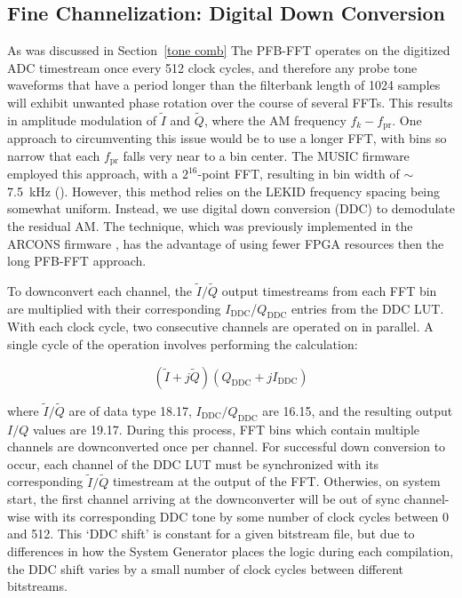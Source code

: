 \subsection{Fine Channelization: Digital Down Conversion}\label{ddc}

As was discussed in Section~\ref{tone comb} The PFB-FFT operates on the digitized ADC timestream once every 512 clock cycles, and therefore any probe tone waveforms that have a period longer than the filterbank length of 1024 samples will exhibit unwanted phase rotation over the course of several FFTs. This results in amplitude modulation of $\widetilde{I}$ and $\widetilde{Q}$, where the AM frequency $f_{k} - f_{\mathrm{pr}}$. One approach to circumventing this issue would be to use a longer FFT, with bins so narrow that each $f_{\mathrm{pr}}$ falls very near to a bin center. The MUSIC firmware employed this approach, with a $2^{16}$-point FFT, resulting in bin width of $\sim${7.5}~kHz (\citet{duan2010open}). However, this method relies on the LEKID frequency spacing being somewhat uniform. Instead, we use digital down conversion (DDC) to demodulate the residual AM\@. The technique, which was previously implemented in the ARCONS firmware \citep{mchugh2012readout}, has the advantage of using fewer FPGA resources then the long PFB-FFT approach.

To downconvert each channel, the $\widetilde{I}/\widetilde{Q}$ output timestreams from each FFT bin are multiplied with their corresponding $I_{\mathrm{DDC}}$/$Q_{\mathrm{DDC}}$ entries from the DDC LUT\@. With each clock cycle, two consecutive channels are operated on in parallel. A single cycle of the operation involves performing the calculation:

\begin{equation}
  (\widetilde{I} + j\widetilde{Q})(Q_{\mathrm{DDC}} + jI_{\mathrm{DDC}})
\end{equation}

where $\widetilde{I}/\widetilde{Q}$ are of data type 18.17, $I_{\mathrm{DDC}}/Q_{\mathrm{DDC}}$ are 16.15, and the resulting output $I/Q$ values are 19.17. During this process, FFT bins which contain multiple channels are downconverted once per channel. For successful down conversion to occur, each channel of the DDC LUT must be synchronized with its corresponding $\widetilde{I}/\widetilde{Q}$ timestream at the output of the FFT\@. Otherwies, on system start, the first channel arriving at the downconverter will be out of sync channel-wise with its corresponding DDC tone by some number of clock cycles between 0 and 512. This `DDC shift' is constant for a given bitstream file, but due to differences in how the System Generator places the logic during each compilation, the DDC shift varies by a small number of clock cycles between different bitstreams.

